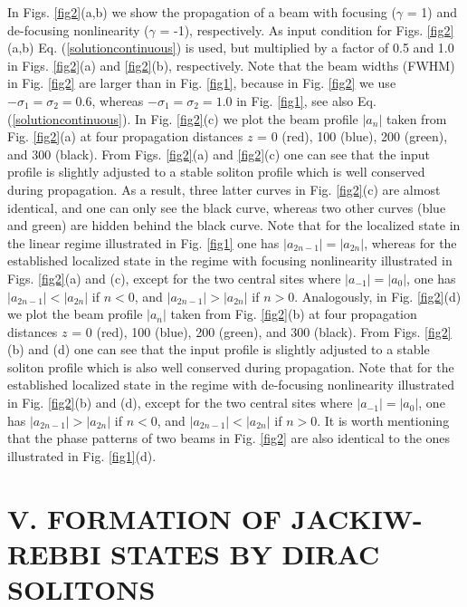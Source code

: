 \documentclass[twocolumn,aps, prl,showpacs]{revtex4}
\begin{document}
In Figs. \ref{fig2}(a,b) we show the propagation of a beam with focusing ($\gamma$ = 1) and de-focusing nonlinearity ($\gamma$ = -1), respectively. As input condition for Figs. \ref{fig2}(a,b) Eq. (\ref{solutioncontinuous}) is used, but multiplied by a factor of 0.5 and 1.0 in Figs. \ref{fig2}(a) and \ref{fig2}(b), respectively. Note that the beam widths (FWHM) in Fig. \ref{fig2} are larger than in Fig. \ref{fig1}, because in Fig. \ref{fig2} we use $-\sigma_{1} = \sigma_{2} = 0.6$, whereas $-\sigma_{1} = \sigma_{2} = 1.0$ in Fig. \ref{fig1}, see also Eq. (\ref{solutioncontinuous}). In Fig. \ref{fig2}(c) we plot the beam profile $|a_{n}|$ taken from Fig. \ref{fig2}(a) at four propagation distances $z$ = 0 (red), 100 (blue), 200 (green), and 300 (black). From Figs. \ref{fig2}(a) and \ref{fig2}(c) one can see that the input profile is slightly adjusted to a stable soliton profile which is well conserved during propagation. As a result, three latter curves in Fig. \ref{fig2}(c) are almost identical, and one can only see the black curve, whereas two other curves (blue and green) are hidden behind the black curve. Note that for the localized state in the linear regime illustrated in Fig. \ref{fig1} one has $|a_{2n-1}| = |a_{2n}|$, whereas for the established localized state in the regime with focusing nonlinearity illustrated in Figs. \ref{fig2}(a) and (c), except for the two central sites where $|a_{-1}| = |a_{0}|$, one has $|a_{2n-1}| < |a_{2n}|$ if $n<0$, and  $|a_{2n-1}| > |a_{2n}|$ if $n>0$. Analogously, in Fig. \ref{fig2}(d) we plot the beam profile $|a_{n}|$ taken from Fig. \ref{fig2}(b) at four propagation distances $z$ = 0 (red), 100 (blue), 200 (green), and 300 (black). From Figs. \ref{fig2}(b) and (d) one can see that the input profile is slightly adjusted to a stable soliton profile which is also well conserved during propagation. Note that for the established localized state in the regime with de-focusing nonlinearity illustrated in Fig. \ref{fig2}(b) and (d), except for the two central sites where $|a_{-1}| = |a_{0}|$, one has $|a_{2n-1}| > |a_{2n}|$ if $n<0$, and  $|a_{2n-1}| < |a_{2n}|$ if $n>0$. It is worth mentioning that the phase patterns of two beams in Fig. \ref{fig2} are also identical to the ones illustrated in Fig. \ref{fig1}(d).


\section{V. FORMATION OF JACKIW-REBBI STATES BY DIRAC SOLITONS}
\label{formation}
\end{document}
